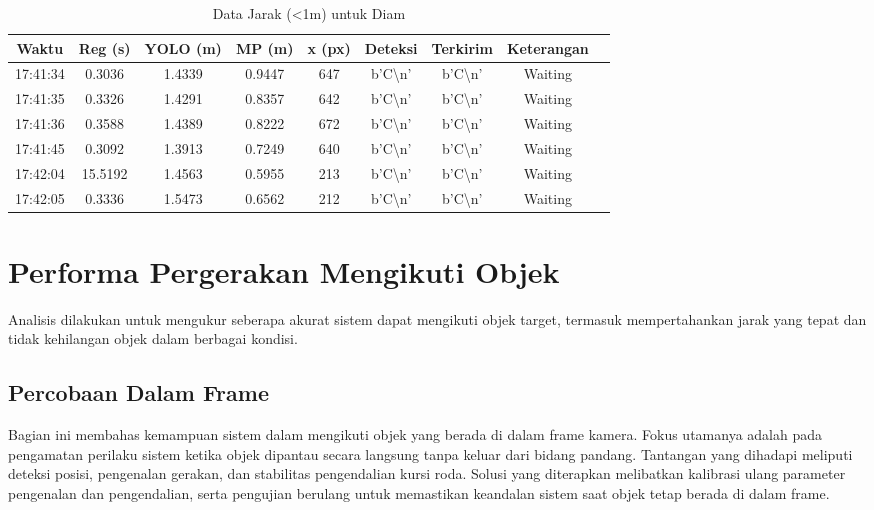 \begin{table}[H]
    \centering
    \caption{Data Jarak (\textless 1m) untuk Diam}
    \label{tab:jarak_diam}
    \begin{tabular}{|c|c|c|c|c|c|c|c|c|}
    \hline
    Waktu & Reg (s) & YOLO (m) & MP (m) & x (px) & Deteksi & Terkirim & Keterangan \\ \hline
    17:41:34 & 0.3036 & 1.4339 & 0.9447 & 647 & b'C\textbackslash n' & b'C\textbackslash n' & Waiting \\ \hline
    17:41:35 & 0.3326 & 1.4291 & 0.8357 & 642 & b'C\textbackslash n' & b'C\textbackslash n' & Waiting \\ \hline
    17:41:36 & 0.3588 & 1.4389 & 0.8222 & 672 & b'C\textbackslash n' & b'C\textbackslash n' & Waiting \\ \hline
    17:41:45 & 0.3092 & 1.3913 & 0.7249 & 640 & b'C\textbackslash n' & b'C\textbackslash n' & Waiting \\ \hline
    17:42:04 & 15.5192 & 1.4563 & 0.5955 & 213 & b'C\textbackslash n' & b'C\textbackslash n' & Waiting \\ \hline
    17:42:05 & 0.3336 & 1.5473 & 0.6562 & 212 & b'C\textbackslash n' & b'C\textbackslash n' & Waiting \\ \hline
    \end{tabular}
    \end{table}

\section{Performa Pergerakan Mengikuti Objek}
\label{sec:performaakurasiobjek}

Analisis dilakukan untuk mengukur seberapa akurat sistem dapat mengikuti objek target, termasuk mempertahankan jarak yang tepat dan tidak kehilangan objek dalam berbagai kondisi.

\subsection{Percobaan Dalam Frame}
\label{subsec:percobaandalamframe}

Bagian ini membahas kemampuan sistem dalam mengikuti objek yang berada di dalam frame kamera. Fokus utamanya adalah pada pengamatan perilaku sistem ketika objek dipantau secara langsung tanpa keluar dari bidang pandang. Tantangan yang dihadapi meliputi deteksi posisi, pengenalan gerakan, dan stabilitas pengendalian kursi roda. Solusi yang diterapkan melibatkan kalibrasi ulang parameter pengenalan dan pengendalian, serta pengujian berulang untuk memastikan keandalan sistem saat objek tetap berada di dalam frame.


